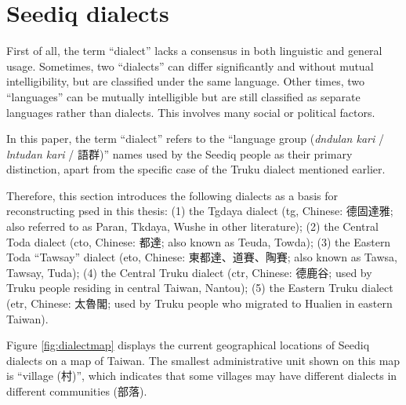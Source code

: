 \section{Seediq dialects}

First of all, the term ``dialect'' lacks a consensus in both linguistic and general usage. Sometimes, two ``dialects'' can differ significantly and without mutual intelligibility, but are classified under the same language. Other times, two ``languages'' can be mutually intelligible but are still classified as separate languages rather than dialects. This involves many social or political factors. 

In this paper, the term ``dialect'' refers to the ``language group (\textit{dndulan kari} / \textit{lntudan kari} / 語群)'' names used by the Seediq people as their primary distinction, apart from the specific case of the Truku dialect mentioned earlier. 

Therefore, this section introduces the following dialects as a basis for reconstructing \acl{psed} in this thesis: (1) the Tgdaya  dialect (\acs{tg}, Chinese: 德固達雅; also referred to as Paran, Tkdaya, Wushe in other literature); (2) the Central Toda dialect (\acs{cto}, Chinese: 都達; also known as Teuda, Towda); (3) the Eastern Toda ``Tawsay'' dialect (\acs{eto}, Chinese: 東都達、道賽、陶賽; also known as Tawsa, Tawsay, Tuda); (4) the Central Truku dialect (\acs{ctr}, Chinese: 德鹿谷; used by Truku people residing in central Taiwan, Nantou); (5) the Eastern Truku dialect (\acs{etr}, Chinese: 太魯閣; used by Truku people who migrated to Hualien in eastern Taiwan).

Figure \ref{fig:dialectmap} displays the current geographical locations of Seediq dialects on a map of Taiwan. The smallest administrative unit shown on this map is ``village (村)'', which indicates that some villages may have different dialects in different communities (部落).

